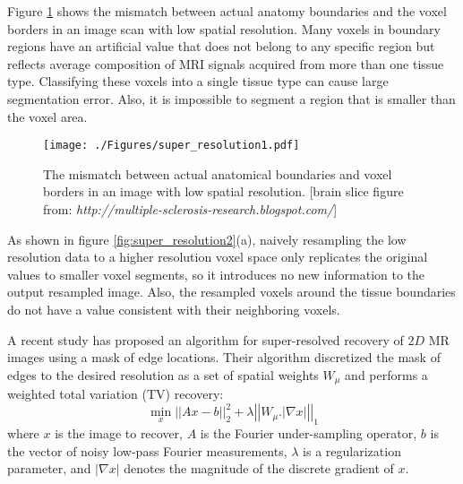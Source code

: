 \noindent Figure \ref{fig:super_resolution1} shows the mismatch between actual anatomy boundaries and the voxel borders in an image scan with low spatial resolution. Many voxels in boundary regions have an artificial value that does not belong to any specific region but reflects average composition of MRI signals acquired from more than one tissue type. Classifying these voxels into a single tissue type can cause large segmentation error. Also, it is impossible to segment a region that is smaller than the voxel area.

\begin{figure}[ht!]
    \begin{center}
      \texttt{[image: ./Figures/super\_resolution1.pdf]}
    \end{center}
    \vspace{-15pt}
    \caption{The mismatch between actual anatomical boundaries and voxel borders in an image with low spatial resolution. [brain slice figure from: \textit{http://multiple-sclerosis-research.blogspot.com/}]}
    \vspace{-5pt}
    \label{fig:super_resolution1}
\end{figure}

\noindent As shown in figure \ref{fig:super_resolution2}(a), naively resampling the low resolution data to a higher resolution voxel space only replicates the original values to smaller voxel segments, so it introduces no new information to the output resampled image. Also, the resampled voxels around the tissue boundaries do not have a value consistent with their neighboring voxels.
\newline

\noindent A recent study \cite{Gompf2014} has proposed an algorithm for super-resolved recovery of $2D$ MR images using a mask of edge locations. Their algorithm discretized the mask of edges to the desired resolution as a set of spatial weights $W_{\mu}$ and performs a weighted total variation (TV) recovery:
\begin{equation}
  \min _{x}\left| \left| Ax-b \right| \right|^{2}_{2} + \lambda\left| \left| W_{\mu}.\left| \nabla x \right|\right| \right|^{}_{1}
\end{equation}
where $x$ is the image to recover, $A$ is the Fourier under-sampling operator, $b$ is the vector of noisy low-pass Fourier measurements, $\lambda$ is a regularization parameter, and $\left| \nabla x \right|$ denotes the magnitude of the discrete gradient of $x$.
\newline

